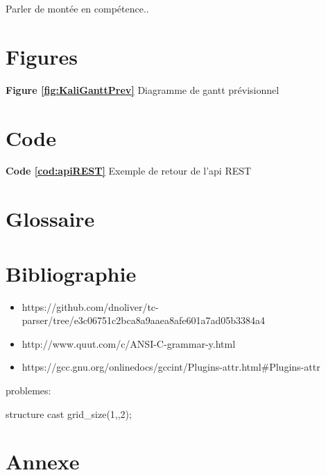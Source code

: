 \documentclass{article}
\begin{document}
	Parler de montée en compétence..
	
	
	\section*{Figures}
\indent
\textbf{Figure \ref{fig:KaliGanttPrev}} Diagramme de gantt prévisionnel\\
\indent

\section*{Code}

\indent
\textbf{Code \ref{cod:apiREST}} Exemple de retour de l'api REST\\
\indent

    


\section*{Glossaire}
\renewcommand{\glossarysection}[2][]{}

\printglossary[title=List of Terms,toctitle=Terms and abbreviations]



\section*{Bibliographie}
\begin{itemize}

\item https://github.com/dnoliver/tc-parser/tree/e3c06751c2bca8a9aaea8afe601a7ad05b3384a4
\item http://www.quut.com/c/ANSI-C-grammar-y.html
\item https://gcc.gnu.org/onlinedocs/gccint/Plugins-attr.html\#Plugins-attr

\end{itemize}
	
problemes:

structure
cast
grid\_size(1,,2);

\newpage
	\section{Annexe}
\end{document}
